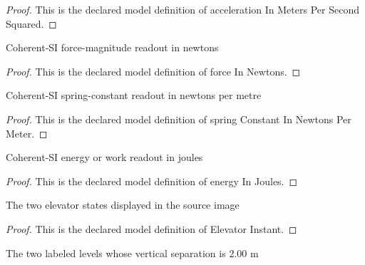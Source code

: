 \begin{proof}
  This is the declared model definition of acceleration In Meters Per Second Squared.
\end{proof}
\begin{definition}
  \label{def:physics:phyx-mini-0814:phyxminiproblems-problemphyxmini0814-forceinnewtons}
  Coherent-SI force-magnitude readout in newtons
\end{definition}
\begin{proof}
  This is the declared model definition of force In Newtons.
\end{proof}
\begin{definition}
  \label{def:physics:phyx-mini-0814:phyxminiproblems-problemphyxmini0814-springconstantinnewtonspermeter}
  Coherent-SI spring-constant readout in newtons per metre
\end{definition}
\begin{proof}
  This is the declared model definition of spring Constant In Newtons Per Meter.
\end{proof}
\begin{definition}
  \label{def:physics:phyx-mini-0814:phyxminiproblems-problemphyxmini0814-energyinjoules}
  Coherent-SI energy or work readout in joules
\end{definition}
\begin{proof}
  This is the declared model definition of energy In Joules.
\end{proof}
\begin{definition}
  \label{def:physics:phyx-mini-0814:phyxminiproblems-problemphyxmini0814-elevatorinstant}
  The two elevator states displayed in the source image
\end{definition}
\begin{proof}
  This is the declared model definition of Elevator Instant.
\end{proof}
\begin{definition}
  \label{def:physics:phyx-mini-0814:phyxminiproblems-problemphyxmini0814-figurepoint}
  The two labeled levels whose vertical separation is 2.00 m
\end{definition}
